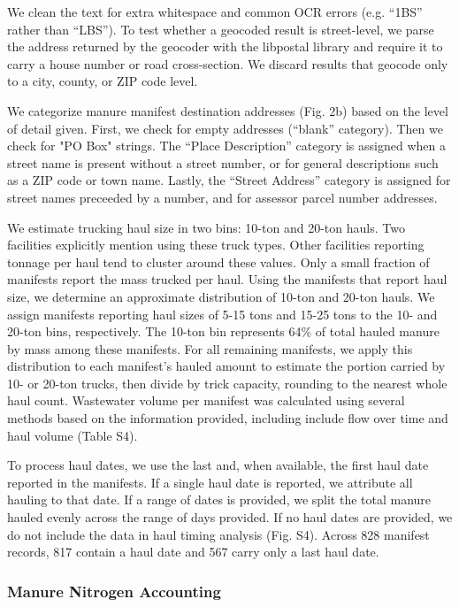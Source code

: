 \documentclass{iopjournal}
\begin{document}
We clean the text for extra whitespace and common OCR errors (e.g. ``1BS'' rather than ``LBS''). To test whether a geocoded result is street-level, we parse the address returned by the geocoder with the libpostal library and require it to carry a house number or road cross-section. We discard results that geocode only to a city, county, or ZIP code level.

We categorize manure manifest destination addresses (Fig. 2b) based on the level of detail given. First, we check for empty addresses (``blank'' category). Then we check for "PO Box" strings. The ``Place Description'' category is assigned when a street name is present without a street number, or for general descriptions such as a ZIP code or town name. Lastly, the ``Street Address'' category is assigned for street names preceeded by a number, and for assessor parcel number addresses. 

We estimate trucking haul size in two bins: 10-ton and 20-ton hauls. Two facilities explicitly mention using these truck types. Other facilities reporting tonnage per haul tend to cluster around these values. Only a small fraction of manifests report the mass trucked per haul. Using the manifests that report haul size, we determine an approximate distribution of 10-ton and 20-ton hauls. We assign manifests reporting haul sizes of 5-15 tons and 15-25 tons to the 10- and 20-ton bins, respectively. The 10-ton bin represents 64\% of total hauled manure by mass among these manifests. For all remaining manifests, we apply this distribution to each manifest's hauled amount to estimate the portion carried by 10- or 20-ton trucks, then divide by trick capacity, rounding to the nearest whole haul count. Wastewater volume per manifest was calculated using several methods based on the information provided, including include flow over time and haul volume (Table S4).

To process haul dates, we use the last and, when available, the first haul date reported in the manifests. If a single haul date is reported, we attribute all hauling to that date. If a range of dates is provided, we split the total manure hauled evenly across the range of days provided. If no haul dates are provided, we do not include the data in haul timing analysis (Fig. S4). Across 828 manifest records, 817 contain a haul date and 567 carry only a last haul date.


\subsubsection{Manure Nitrogen Accounting}
\end{document}
